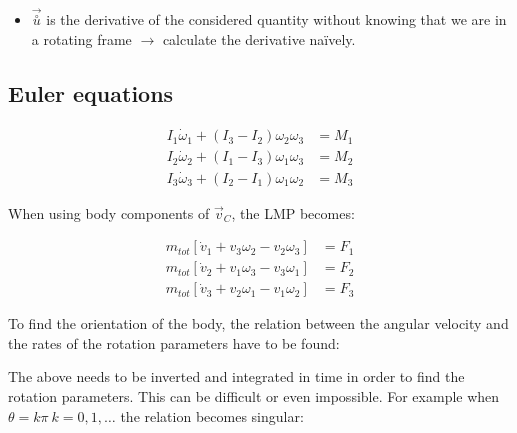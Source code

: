 \documentclass[10pt,a4paper]{scrartcl}
\begin{document}
\begin{multicols*}{2}

\begin{itemize}
\item $\vec{\overset{\circ}{u}}$ is the derivative of the considered quantity without knowing that we are in a rotating frame $\rightarrow$ calculate the derivative naïvely.
\end{itemize}

\subsection{Euler equations}

\begin{align*}
I_1\dot{\omega}_1+(I_3-I_2)\omega_2\omega_3&=M_1\\
I_2\dot{\omega}_2+(I_1-I_3)\omega_1\omega_3&=M_2\\
I_3\dot{\omega}_3+(I_2-I_1)\omega_1\omega_2&=M_3
\end{align*}

When using body components of $\vec{v}_C$, the LMP becomes:



\begin{align*}
m_{tot}\left[\dot{v}_1+v_3\omega_2-v_2\omega_3\right]&=F_1\\
m_{tot}\left[\dot{v}_2+v_1\omega_3-v_3\omega_1\right]&=F_2\\
m_{tot}\left[\dot{v}_3+v_2\omega_1-v_1\omega_2\right]&=F_3
\end{align*}

To find the orientation of the body, the relation between the angular velocity and the rates of the rotation parameters have to be found:


The above needs to be inverted and integrated in time in order to find the rotation parameters. This can be difficult or even impossible. For example when $\theta =k\pi\ k=0,1,\ldots$ the relation becomes singular:


\end{multicols*}
\end{document}
